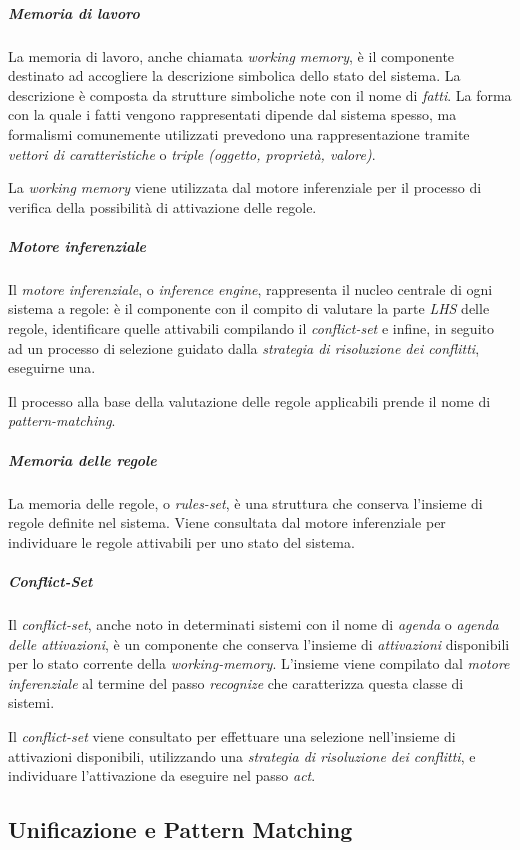 \subparagraph{Memoria di lavoro}
La memoria di lavoro, anche chiamata \emph{working memory}, è il componente destinato ad accogliere la descrizione simbolica dello stato del sistema. La descrizione è composta da strutture simboliche note con il nome di \emph{fatti}. La forma con la quale i fatti vengono rappresentati dipende dal sistema spesso, ma formalismi comunemente utilizzati prevedono una rappresentazione tramite \emph{vettori di caratteristiche} o \emph{triple (oggetto, proprietà, valore)}.

La \emph{working memory} viene utilizzata dal motore inferenziale per il processo di verifica della possibilità di attivazione delle regole.

\subparagraph{Motore inferenziale}

Il \emph{motore inferenziale}, o \emph{inference engine}, rappresenta il nucleo centrale di ogni sistema a regole: è il componente con il compito di valutare la parte \emph{LHS} delle regole, identificare quelle attivabili compilando il \emph{conflict-set} e infine, in seguito ad un processo di selezione guidato dalla \emph{strategia di risoluzione dei conflitti}, eseguirne una.

Il processo alla base della valutazione delle regole applicabili prende il nome di \emph{pattern-matching}.

\subparagraph{Memoria delle regole}
La memoria delle regole, o \emph{rules-set}, è una struttura che conserva l'insieme di regole definite nel sistema. Viene consultata dal motore inferenziale per individuare le regole attivabili per uno stato del sistema.

\subparagraph{Conflict-Set}
Il \emph{conflict-set}, anche noto in determinati sistemi con il nome di \emph{agenda} o \emph{agenda delle attivazioni}, è un componente che conserva l'insieme di \emph{attivazioni} disponibili per lo stato corrente della \emph{working-memory}. L'insieme viene compilato dal \emph{motore inferenziale} al termine del passo \emph{recognize} che caratterizza questa classe di sistemi.

Il \emph{conflict-set} viene consultato per effettuare una selezione nell'insieme di attivazioni disponibili, utilizzando una \emph{strategia di risoluzione dei conflitti}, e individuare l'attivazione da eseguire nel passo \emph{act}.

\subsection{Unificazione e Pattern Matching}\label{par:pattern-matching}

